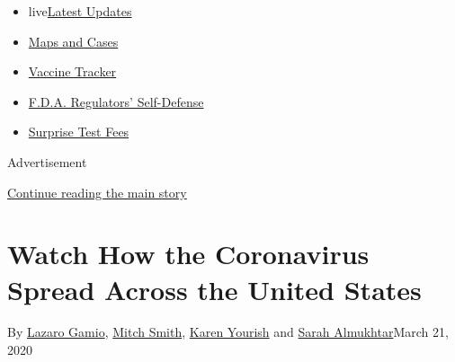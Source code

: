 \begin{itemize}
\tightlist
\item
  live\href{https://www.nytimes3xbfgragh.onion/2020/09/11/world/covid-19-coronavirus.html?name=styln-coronavirus-national\&region=TOP_BANNER\&block=storyline_menu_recirc\&action=click\&pgtype=Interactive\&impression_id=fc44f221-f4bb-11ea-b769-7b51bbcc4e11\&variant=undefined}{Latest
  Updates}
\item
  \href{https://www.nytimes3xbfgragh.onion/interactive/2020/us/coronavirus-us-cases.html?name=styln-coronavirus-national\&region=TOP_BANNER\&block=storyline_menu_recirc\&action=click\&pgtype=Interactive\&impression_id=fc44f222-f4bb-11ea-b769-7b51bbcc4e11\&variant=undefined}{Maps
  and Cases}
\item
  \href{https://www.nytimes3xbfgragh.onion/interactive/2020/science/coronavirus-vaccine-tracker.html?name=styln-coronavirus-national\&region=TOP_BANNER\&block=storyline_menu_recirc\&action=click\&pgtype=Interactive\&impression_id=fc44f223-f4bb-11ea-b769-7b51bbcc4e11\&variant=undefined}{Vaccine
  Tracker}
\item
  \href{https://www.nytimes3xbfgragh.onion/2020/09/10/us/politics/fda-coronavirus-vaccine.html?name=styln-coronavirus-national\&region=TOP_BANNER\&block=storyline_menu_recirc\&action=click\&pgtype=Interactive\&impression_id=fc451930-f4bb-11ea-b769-7b51bbcc4e11\&variant=undefined}{F.D.A.
  Regulators' Self-Defense}
\item
  \href{https://www.nytimes3xbfgragh.onion/2020/09/09/upshot/coronavirus-surprise-test-fees.html?name=styln-coronavirus-national\&region=TOP_BANNER\&block=storyline_menu_recirc\&action=click\&pgtype=Interactive\&impression_id=fc451931-f4bb-11ea-b769-7b51bbcc4e11\&variant=undefined}{Surprise
  Test Fees}
\end{itemize}

Advertisement

\protect\hyperlink{after-top}{Continue reading the main story}

\hypertarget{watch-how-the-coronavirus-spread-across-the-united-states}{%
\section{Watch How the Coronavirus Spread Across the United
States}\label{watch-how-the-coronavirus-spread-across-the-united-states}}

By \href{https://www.nytimes3xbfgragh.onion/by/lazaro-gamio}{Lazaro
Gamio}, \href{https://www.nytimes3xbfgragh.onion/by/mitch-smith}{Mitch
Smith}, \href{https://www.nytimes3xbfgragh.onion/by/karen-yourish}{Karen
Yourish} and
\href{https://www.nytimes3xbfgragh.onion/by/sarah-almukhtar}{Sarah
Almukhtar}March 21, 2020

